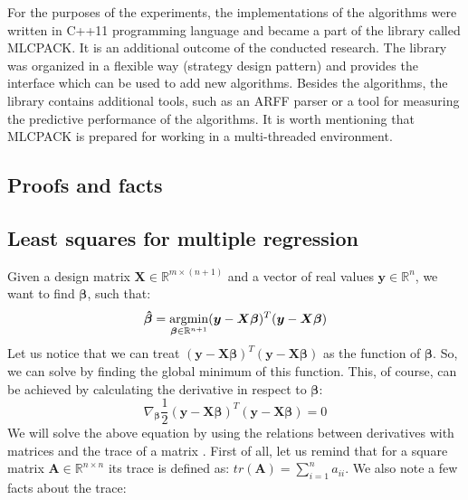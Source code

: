 \documentclass[english,a4paper,twoside]{ppfcmthesis}
\begin{document}
For the purposes of the experiments, the implementations of the algorithms were written in C++11 programming language and became a part of the library called MLCPACK. It is an additional outcome of the conducted research. The library was organized in a flexible way (strategy design pattern) and provides the interface which can be used to add new algorithms. Besides the algorithms, the library contains additional tools, such as an ARFF parser or a tool for measuring the predictive performance of the algorithms. It is worth mentioning that MLCPACK is prepared for working in a multi-threaded environment.

\cleardoublepage
\begin{appendices}

\chapter{Proofs and facts}

\section{Least squares for multiple regression}
\label{app:least}

Given a design matrix $\boldsymbol{X} \in \mathbb{R}^{m \times (n+1)}$ and a vector of real values $\boldsymbol{y} \in \mathbb{R}^{n}$, we want to find $\boldsymbol{\beta}$, such that:
\begin{equation}\label{eq:least0}
    \boldsymbol{\hat{\beta}} = \operatorname*{argmin}_{\boldsymbol{\beta} \in \mathbb{R}^{n+1}}(\boldsymbol{y}-\boldsymbol{X}\boldsymbol{\beta})^T(\boldsymbol{y}-\boldsymbol{X}\boldsymbol{\beta})
\end{equation}
Let us notice that we can treat $(\boldsymbol{y}-\boldsymbol{X}\boldsymbol{\beta})^T(\boldsymbol{y}-\boldsymbol{X}\boldsymbol{\beta})$ as the function of $\boldsymbol{\beta}$. So, we can solve  by finding the global minimum of this function. This, of course, can be achieved by calculating the derivative in respect to $\boldsymbol{\beta}$:
\begin{equation}\label{eq:least1}
    \nabla_{\boldsymbol{\beta}} \frac{1}{2}(\boldsymbol{y}-\boldsymbol{X}\boldsymbol{\beta})^T(\boldsymbol{y}-\boldsymbol{X}\boldsymbol{\beta}) = 0
\end{equation}
We will solve the above equation by using the relations between derivatives with matrices and the trace of a matrix \citep{LRV}. First of all, let us remind that for a square matrix $\boldsymbol{A} \in \mathbb{R}^{n \times n}$ its trace is defined as: $tr(\boldsymbol{A})= \sum\limits_{i=1}^{n}a_{ii}$. We also note a few facts about the trace:


\end{appendices}
\end{document}
